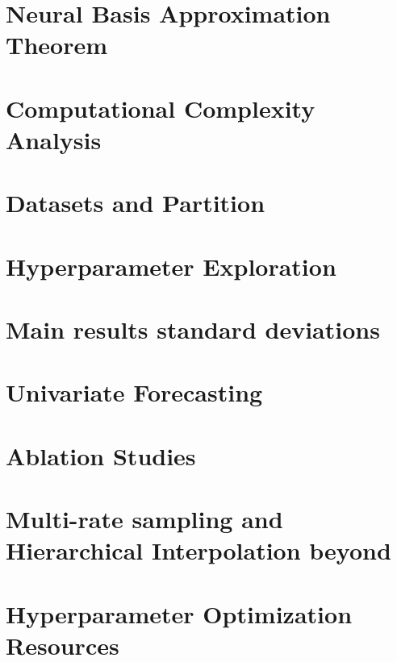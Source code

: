 \setcounter{table}{0}
\setcounter{figure}{0}
\renewcommand{\thetable}{A\arabic{table}}

\section{Neural Basis Approximation Theorem}
\label{section:neural_basis_approximation}



\section{Computational Complexity Analysis} \label{section:complexity}


\section{Datasets and Partition} \label{appendix:datasets}



\section{Hyperparameter Exploration} \label{section:benchmark_hyperparameters}


\section{Main results standard deviations}
\label{section:standard_deviations}


\section{Univariate Forecasting} \label{section:univariate_forecasting}


\newpage
\section{Ablation Studies} \label{appendix:ablation}


\newpage
\section{Multi-rate sampling and Hierarchical Interpolation beyond \ours} \label{section:rnn}


\section{Hyperparameter Optimization Resources} \label{section:hyperparameter_resources}

